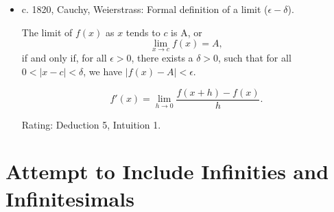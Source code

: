 \documentclass{beamer}
\newcommand{\ls}{\leftindex^*}
\newcommand{\RR}{\mathbb{R}}
\newcommand{\HR}{\ls{\RR}}
\begin{document}
\begin{frame}
    \begin{itemize}
        \item c. 1820, Cauchy, Weierstrass: Formal definition of a limit (\(\epsilon-\delta\)).\pause

              \begin{definition}
                  The limit of \(f(x)\) as \(x\) tends to \(c\) is A, or
                  \[
                      \lim_{x \to c} f(x) = A,
                  \]
                  if and only if, for all \(\epsilon > 0\), there exists a \(\delta > 0\), such that for all \(0 < |x - c| < \delta\), we have \(|f(x) - A| < \epsilon\).
              \end{definition}\pause

              \begin{definition}
                  \[f'(x) = \lim_{h \to 0} \frac{f(x+h) - f(x)}{h}.\]
              \end{definition}

              Rating: \pause Deduction 5, \pause Intuition 1.
    \end{itemize}
\end{frame}


\section{Attempt to Include Infinities and Infinitesimals}

\end{document}
